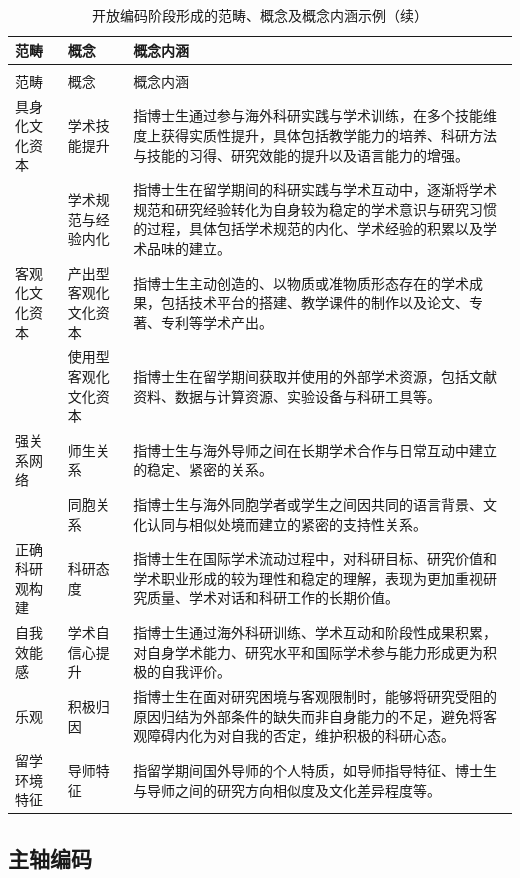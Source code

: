 {\small
\begin{longtable}{p{2.5cm}p{3.5cm}p{8cm}}
\caption{开放编码阶段形成的范畴、概念及概念内涵示例} \label{tab:open-coding-categories} \\
\toprule
范畴 & 概念 & 概念内涵 \\
\midrule
\endfirsthead
\caption[]{开放编码阶段形成的范畴、概念及概念内涵示例（续）} \\
\toprule
范畴 & 概念 & 概念内涵 \\
\midrule
\endhead
\bottomrule
\endfoot
具身化文化资本 & 学术技能提升 & 指博士生通过参与海外科研实践与学术训练，在多个技能维度上获得实质性提升，具体包括教学能力的培养、科研方法与技能的习得、研究效能的提升以及语言能力的增强。 \\
 & 学术规范与经验内化 & 指博士生在留学期间的科研实践与学术互动中，逐渐将学术规范和研究经验转化为自身较为稳定的学术意识与研究习惯的过程，具体包括学术规范的内化、学术经验的积累以及学术品味的建立。 \\
客观化文化资本 & 产出型客观化文化资本 & 指博士生主动创造的、以物质或准物质形态存在的学术成果，包括技术平台的搭建、教学课件的制作以及论文、专著、专利等学术产出。 \\
 & 使用型客观化文化资本 & 指博士生在留学期间获取并使用的外部学术资源，包括文献资料、数据与计算资源、实验设备与科研工具等。 \\
强关系网络 & 师生关系 & 指博士生与海外导师之间在长期学术合作与日常互动中建立的稳定、紧密的关系。 \\
 & 同胞关系 & 指博士生与海外同胞学者或学生之间因共同的语言背景、文化认同与相似处境而建立的紧密的支持性关系。 \\
正确科研观构建 & 科研态度 & 指博士生在国际学术流动过程中，对科研目标、研究价值和学术职业形成的较为理性和稳定的理解，表现为更加重视研究质量、学术对话和科研工作的长期价值。 \\
自我效能感 & 学术自信心提升 & 指博士生通过海外科研训练、学术互动和阶段性成果积累，对自身学术能力、研究水平和国际学术参与能力形成更为积极的自我评价。 \\
乐观 & 积极归因 & 指博士生在面对研究困境与客观限制时，能够将研究受阻的原因归结为外部条件的缺失而非自身能力的不足，避免将客观障碍内化为对自我的否定，维护积极的科研心态。 \\
留学环境特征 & 导师特征 & 指留学期间国外导师的个人特质，如导师指导特征、博士生与导师之间的研究方向相似度及文化差异程度等。 \\
\end{longtable}
}

\subsection{主轴编码}

